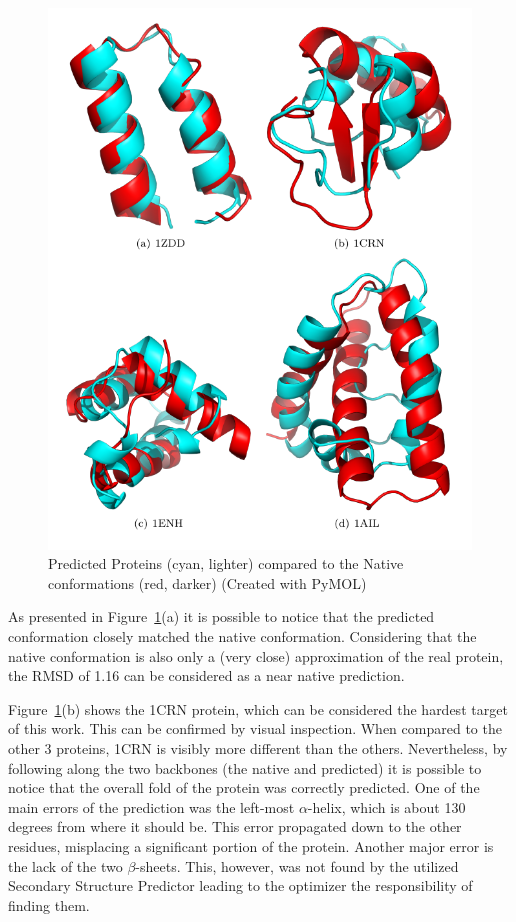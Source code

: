 \begin{figure}[ht]
    \centering
    \includegraphics{Figuras/visual_comparison_image.pdf}
    \caption{Predicted Proteins (cyan, lighter) compared to the Native conformations (red, darker)
    (Created with PyMOL)}
    \label{fig:visual-comparison}
\end{figure}


As presented in Figure~\ref{fig:visual-comparison}(a) it is possible to notice that the predicted conformation closely matched the native conformation. Considering that the native conformation is also only a (very close) approximation of the real protein, the \ac{RMSD} of 1.16 can be considered as a near native prediction. 

Figure~\ref{fig:visual-comparison}(b) shows the 1CRN protein, which can be considered the hardest target of this work. This can be confirmed by visual inspection. When compared to the other 3 proteins, 1CRN is visibly more different than the others. Nevertheless, by following along the two backbones (the native and predicted) it is possible to notice that the overall fold of the protein was correctly predicted. One of the main errors of the prediction was the left-most $\alpha$-helix, which is about 130 degrees from where it should be. This error propagated down
to the other residues, misplacing a significant portion of the protein. Another major error is the lack of the two $\beta$-sheets. This, however, was not found by the utilized Secondary Structure Predictor leading to the optimizer the responsibility of finding them.

